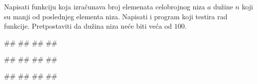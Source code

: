 \begin{Exercise}[label=p.broj_manjih_od_poslednjeg] 
 Napisati funkciju  koja izračunava broj elemenata celobrojnog niza $a$ dužine $n$ koji su manji od poslednjeg elementa niza. Napisati i program koji testira rad funkcije. Pretpostaviti da dužina niza neće biti veća od $100$. 
 
\begin{miditest}
\begin{upotreba}{1}
#\naslovInt#
##
##
##
\end{upotreba}
\end{miditest}
\begin{miditest}
\begin{upotreba}{2}
#\naslovInt#
##
##
##
\end{upotreba}
\end{miditest}

\begin{miditest}
\begin{upotreba}{3}
#\naslovInt#
##
##
##
\end{upotreba}
\end{miditest}

\end{Exercise}
\begin{Answer}[ref=p.broj_manjih_od_poslednjeg]
\end{Answer}

